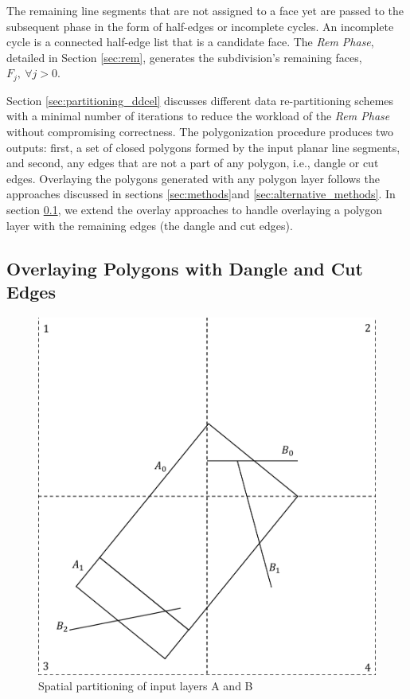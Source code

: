 The remaining line segments that are not assigned to a face yet are passed to the subsequent phase in the form of half-edges or incomplete cycles. An 
incomplete 
cycle is a connected half-edge list that is a candidate face. The \textit{Rem Phase}, detailed in Section \ref{sec:rem}, generates the subdivision's remaining 
faces, $F_j, \ \forall j > 0$. 

Section \ref{sec:partitioning_ddcel} discusses different data re-partitioning schemes with a minimal number of iterations to reduce the workload of the 
\textit{Rem Phase} without compromising correctness. The polygonization procedure produces two outputs: first, a set of closed polygons formed by the input 
planar line segments, and second, any edges that are not a part of any polygon, i.e., dangle or cut edges. Overlaying the polygons generated with any polygon 
layer follows the approaches discussed in sections \ref{sec:methods}and \ref{sec:alternative_methods}. In section \ref{sec:over_dang}, we extend the overlay 
approaches to handle overlaying a polygon layer with the remaining edges (the dangle and cut edges).





\subsection{Overlaying Polygons with Dangle and Cut Edges} \label{sec:over_dang}

\begin{figure}[tb]
	\centering
	\includegraphics[width=0.75 \linewidth ]{chapterSDCEL/model/DangleOverlay1.pdf}
	\caption{Spatial partitioning of input layers A and B}
	\label{fig:dangleoverlay:input}
\end{figure}

